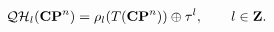 \begin{equation}
{\cal QH}_l({\bf CP}^n)=\rho_l(T({\bf CP}^n)) \oplus \tau^l, \qquad l\in {\bf Z}.
\label{adxx}
\end{equation} 
